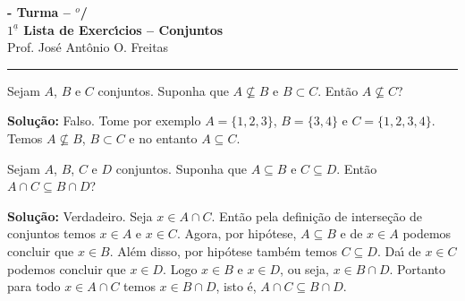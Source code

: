 \documentclass[12pt]{exam}
\begin{document}
\begin{center}
{\Large\bf \disciplina - Turma \turma -- \semestre$^{o}$/\ano} \\ \vspace{9pt} {\large\bf
  $1^{\underline{a}}$ Lista de Exerc{\'\i}cios -- Conjuntos}\\ \vspace{9pt} Prof. Jos{\'e} Ant{\^o}nio O. Freitas
\end{center}
\hrule

\vspace{.6cm}


\vspace{.6cm}

\questao Sejam $A$, $B$ e $C$ conjuntos. Suponha que $A \nsubseteq B$ e $B \subset C$. Ent\~ao $A \nsubseteq C$?

\noindent\textbf{Solu\c{c}\~ao:} Falso. Tome por exemplo $A = \{1,2,3\}$, $B = \{3,4\}$ e $C = \{1,2,3,4\}$. Temos $A \nsubseteq B$, $B \subset C$ e no entanto $A \subseteq C$.

\vspace{.5cm}

\questao Sejam $A$, $B$, $C$ e $D$ conjuntos. Suponha que $A \subseteq B$ e $C \subseteq D$. Ent\~ao $A \cap C \subseteq B \cap D$?

\noindent\textbf{Solu\c{c}\~ao:} Verdadeiro. Seja $x \in A \cap C$. Ent\~ao pela defini\c{c}\~ao de interse\c{c}\~ao de conjuntos temos $x \in A$ e $x \in C$. Agora, por hip\'otese, $A \subseteq B$ e de $x \in A$ podemos concluir que $x \in B$. Al\'em disso, por hip\'otese tamb\'em temos $C \subseteq D$. Da{\'\i} de $x \in C$ podemos concluir que $x \in D$. Logo $x \in B$ e $x \in D$, ou seja, $x \in B \cap D$. Portanto para todo $x \in A \cap C$ temos $x \in B \cap D$, isto \'e, $A \cap C \subseteq B \cap D$.
\end{document}
